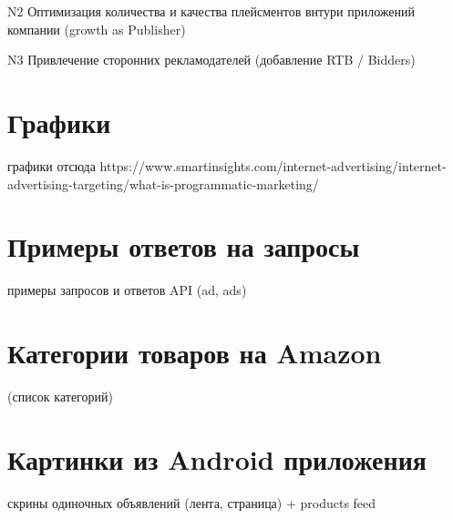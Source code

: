 \documentclass[times]{itmo-student-thesis}
\begin{document}
N2 Оптимизация количества и качества плейсментов внтури приложений компании (growth as Publisher)

N3 Привлечение сторонних рекламодателей (добавление RTB / Bidders)

\printmainbibliography


\appendix

\chapter{Графики}\label{sec:app:1}

графики отсюда https://www.smartinsights.com/internet-advertising/internet-advertising-targeting/what-is-programmatic-marketing/

\chapter{Примеры ответов на запросы}\label{sec:app:2}

примеры запросов и ответов API (ad, ads)

\chapter{Категории товаров на Amazon}\label{sec:app:3}

(список категорий)

\chapter{Картинки из Android приложения}\label{sec:app:4}

скрины одиночных объявлений (лента, страница) + products feed
\end{document}
